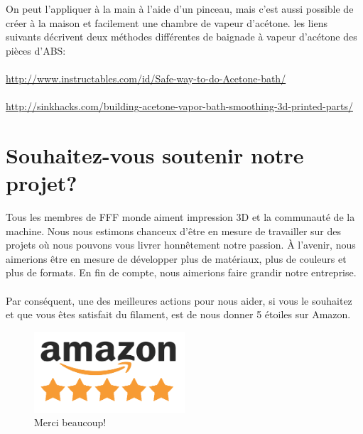 \documentclass[11pt,a4paper]{article}
\begin{document}
On peut l’appliquer à la main à l’aide d’un pinceau, mais c’est aussi possible de créer à la maison et facilement une chambre de vapeur d’acétone. les liens suivants décrivent deux méthodes différentes de baignade à vapeur d’acétone des pièces d'ABS:
\\\\
\url{http://www.instructables.com/id/Safe-way-to-do-Acetone-bath/}\\\\
\url{http://sinkhacks.com/building-acetone-vapor-bath-smoothing-3d-printed-parts/}
\section{Souhaitez-vous soutenir notre projet?}
Tous les membres de FFF monde aiment impression 3D et la communauté de la machine. Nous nous estimons chanceux d’être en mesure de travailler sur des projets où nous pouvons vous livrer honnêtement notre passion. À l’avenir, nous aimerions être en mesure de développer plus de matériaux, plus de couleurs et plus de formats. En fin de compte, nous aimerions faire grandir notre entreprise.
\\\\
Par conséquent, une des meilleures actions pour nous aider, si vous le souhaitez et que vous êtes satisfait du filament, est de nous donner 5 étoiles sur Amazon.
\begin{figure}[H]
\centering
\includegraphics[width=0.5\textwidth,cfbox=azul_marcos 1pt 0pt]{FOTOS/AMAZON_FIVE_STARS}
\caption*{Merci beaucoup!}
\end{figure}
\end{document}
